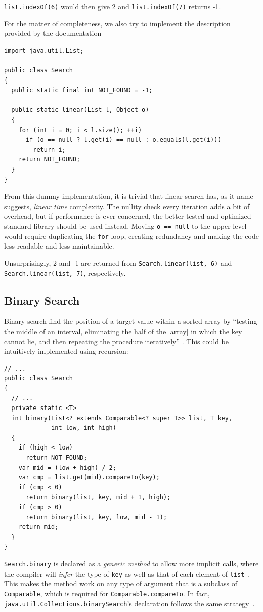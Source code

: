 \documentclass[a4paper,12pt]{article}
\begin{document}
\verb|list.indexOf(6)| would then give 2 and \verb|list.indexOf(7)| returns -1.

For the matter of completeness, we also try to implement the description
provided by the documentation~\cite[indexOf]{list}
\begin{verbatim}
import java.util.List;

public class Search
{
  public static final int NOT_FOUND = -1;

  public static linear(List l, Object o)
  {
    for (int i = 0; i < l.size(); ++i)
      if (o == null ? l.get(i) == null : o.equals(l.get(i)))
        return i;
    return NOT_FOUND;
  }
}
\end{verbatim}

From this dummy implementation, it is trivial that linear search has,
as it name suggests, \emph{linear time} complexity.  The nullity check
every iteration adds a bit of overhead, but if performance is ever concerned,
the better tested and optimized standard library should be used instead.
Moving \verb|o == null| to the upper level would require duplicating
the \verb|for| loop, creating redundancy and making the code less readable
and less maintainable.

Unsurprisingly, 2 and -1 are returned from
\verb|Search.linear(list, 6)| and \verb|Search.linear(list, 7)|,
respectively.

\subsection{Binary Search}
Binary search find the position of a target value within a sorted array by
``testing the middle of an interval, eliminating the half of the [array] in
which the key cannot lie, and then repeating the procedure iteratively''
\cite{bsearch}.  This could be intuitively implemented using recursion:
\begin{verbatim}
// ...
public class Search
{
  // ...
  private static <T>
  int binary(List<? extends Comparable<? super T>> list, T key,
             int low, int high)
  {
    if (high < low)
      return NOT_FOUND;
    var mid = (low + high) / 2;
    var cmp = list.get(mid).compareTo(key);
    if (cmp < 0)
      return binary(list, key, mid + 1, high);
    if (cmp > 0)
      return binary(list, key, low, mid - 1);
    return mid;
  }
}
\end{verbatim}

\verb|Search.binary| is declared as a \emph{generic method} to allow
more implicit calls, where the compiler will \emph{infer} the type of \verb|key|
as well as that of each element of \verb|list|~\cite{infer}.  This makes
the method work on any type of argument that is a subclass of \verb|Comparable|,
which is required for \verb|Comparable.compareTo|.  In fact,
\verb|java.util.Collections.binarySearch|'s declaration follows
the same strategy~\cite[binarySearch]{collections}.
\end{document}
